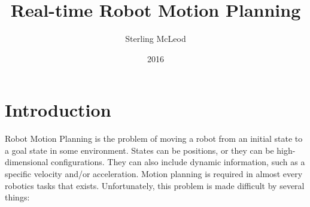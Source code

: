 \documentclass[10pt,conference]{ieeeconf}
\begin{document}


\nocite{PRM}
\nocite{RRT}

\nocite{EPN_Adaptive}
\nocite{RAMP}


\author{Sterling McLeod}
\title {Real-time Robot Motion Planning}
\date {2016}

\maketitle

\renewcommand{\algorithmicforall}{\textbf{for each}}

\section{Introduction}

	Robot Motion Planning is the problem of moving a robot from an initial state to a goal state in some environment. States can be positions, or they can be high-dimensional configurations. They can also include dynamic information, such as a specific velocity and/or acceleration.	Motion planning is required in almost every robotics tasks that exists. Unfortunately, this problem is made difficult by several things: 
	
\end{document}
